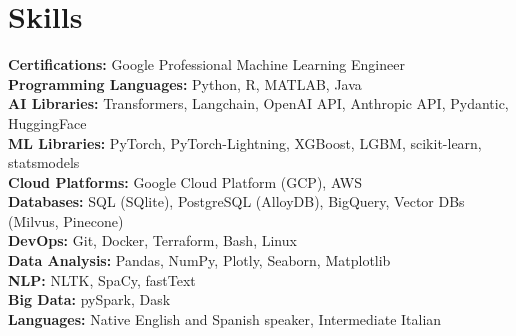 \documentclass[a4paper,11pt]{article}
\begin{document}
\vspace{-0.3cm}

\section{\textbf{Skills}}
 \begin{itemize}[leftmargin=0.15in, label={}]
    {\item{
    \textbf{Certifications:} Google Professional Machine Learning Engineer \\
     \textbf{Programming Languages:} Python, R, MATLAB, Java \\
     \textbf{AI Libraries:} Transformers, Langchain, OpenAI API, Anthropic API, Pydantic, HuggingFace \\
     \textbf{ML Libraries:} PyTorch, PyTorch-Lightning, XGBoost, LGBM, scikit-learn, statsmodels \\
     \textbf{Cloud Platforms:} Google Cloud Platform (GCP), AWS \\
     \textbf{Databases:} SQL (SQlite), PostgreSQL (AlloyDB), BigQuery, Vector DBs (Milvus, Pinecone) \\
     \textbf{DevOps:} Git, Docker, Terraform, Bash, Linux \\
     \textbf{Data Analysis:} Pandas, NumPy, Plotly, Seaborn, Matplotlib \\
     \textbf{NLP:} NLTK, SpaCy, fastText \\
     \textbf{Big Data:} pySpark, Dask \\
     \textbf{Languages:} Native English and Spanish speaker, Intermediate Italian
    }}
 \end{itemize}
\end{document}
